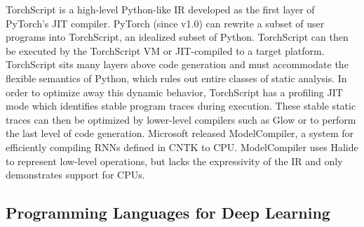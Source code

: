 TorchScript is a high-level Python-like IR developed as the first
    layer of PyTorch's JIT compiler.
PyTorch (since v1.0) can rewrite a subset of user programs into
    TorchScript, an idealized subset of Python.
TorchScript can then be executed by the TorchScript VM or JIT-compiled to a target platform.
TorchScript sits many layers above code generation and must accommodate
    the flexible semantics of Python, which rules out entire classes of static analysis.
In order to optimize away this dynamic behavior, TorchScript has
    a profiling JIT mode which identifies stable program traces
    during execution.
These stable static traces can then be optimized by lower-level
    compilers such as Glow or \relay to perform the last level of code generation.
Microsoft released ModelCompiler, a system for efficiently compiling RNNs defined
    in CNTK to CPU.
ModelCompiler uses Halide to represent low-level operations, but lacks
    the expressivity of the \relay IR and only demonstrates support for CPUs.

\subsection{Programming Languages for Deep Learning}
\label{sec:pl_techniques_in_dl}

